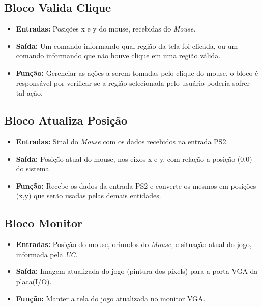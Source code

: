 \documentclass{article}
\begin{document}
    \subsection{Bloco Valida Clique}
        \begin{itemize}
            \item \textbf{Entradas:} Posições x e y do mouse, recebidas do \emph{Mouse}.
            \item \textbf{Saída:} Um comando informando qual região da tela foi clicada, ou um comando informando que não houve clique em uma região válida.
            \item \textbf{Função:} Gerenciar as ações a serem tomadas pelo clique do mouse, o bloco é responsável por verificar se a região selecionada pelo usuário poderia sofrer tal ação.
        \end{itemize}
        
    \subsection{Bloco Atualiza Posição}
        \begin{itemize}
            \item \textbf{Entradas:} Sinal do \emph{Mouse} com os dados recebidos na entrada PS2.
            \item \textbf{Saída:} Posição atual do mouse, nos eixos x e y, com relação a posição (0,0) do sistema. 
            \item \textbf{Função:} Recebe os dados da entrada PS2 e converte os mesmos em posições (x,y) que serão usadas pelas demais entidades.   
        \end{itemize}
    
    \subsection{Bloco Monitor}
        \begin{itemize}
            \item \textbf{Entradas:} Posição do mouse, oriundos do \emph{Mouse}, e situação atual do jogo, informada pela \emph{UC}.
            \item \textbf{Saída:} Imagem atualizada do jogo (pintura dos pixels) para a porta VGA da placa(I/O).
            \item \textbf{Função:} Manter a tela do jogo atualizada no monitor VGA.
        \end{itemize}
\end{document}

